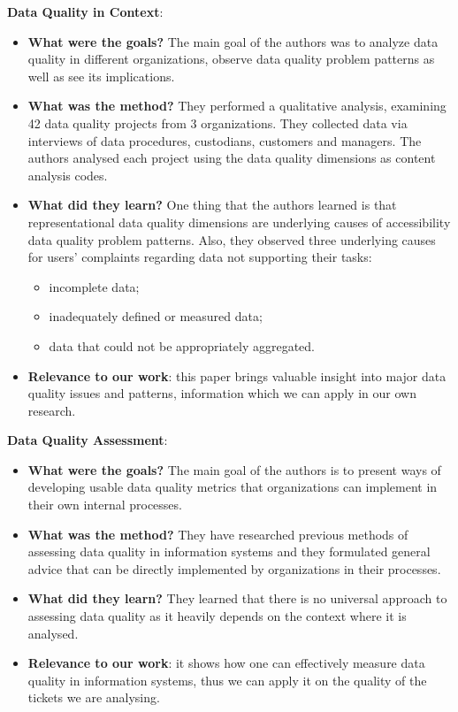 \documentclass{mprop}
\begin{document}
\textbf{Data Quality in Context}\cite{strong1997data}:
\begin{itemize}
  \item \textbf{What were the goals?}
    The main goal of the authors was to analyze data quality in different 
    organizations, observe data quality problem patterns as well as see 
    its implications.
  \item \textbf{What was the method?}
    They performed a qualitative analysis, examining 42 data quality projects 
    from 3 organizations. They collected data via interviews of data procedures,
    custodians, customers and managers. The authors analysed each project using
    the data quality dimensions as content analysis codes. 
  \item \textbf{What did they learn?}
    One thing that the authors learned is that representational data quality 
    dimensions are underlying causes of accessibility data quality problem 
    patterns. Also, they observed three underlying causes for users' complaints
    regarding data not supporting their tasks:
      \begin{itemize}
        \item incomplete data;
        \item inadequately defined or measured data;
        \item data that could not be appropriately aggregated.
      \end{itemize}
  \item \textbf{Relevance to our work}: this paper brings valuable insight into
    major data quality issues and patterns, information which we can apply in 
    our own research.
\end{itemize}

\textbf{Data Quality Assessment}\cite{pipino2002data}:
\begin{itemize}
  \item \textbf{What were the goals?}
    The main goal of the authors is to present ways of developing usable data
    quality metrics that organizations can implement in their own internal 
    processes.
  \item \textbf{What was the method?}
    They have researched previous methods of assessing data quality in information
    systems and they formulated general advice that can be directly implemented
    by organizations in their processes.
  \item \textbf{What did they learn?}
    They learned that there is no universal approach to assessing data quality
    as it heavily depends on the context where it is analysed.
  \item \textbf{Relevance to our work}: it shows how one can effectively measure
    data quality in information systems, thus we can apply it on the quality of
    the tickets we are analysing.
\end{itemize}
\end{document}
